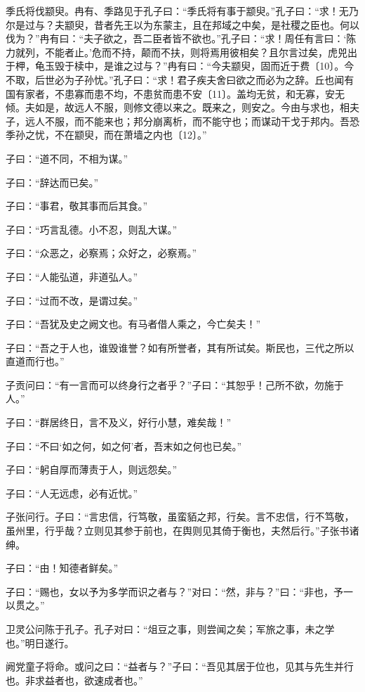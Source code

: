 \documentclass[a5paper]{ctexbook}
\begin{document}
    季氏将伐颛臾。冉有、季路见于孔子曰：“季氏将有事于颛臾。”孔子曰：“求！无乃尔是过与？夫颛臾，昔者先王以为东蒙主，且在邦域之中矣，是社稷之臣也。何以伐为？”冉有曰：“夫子欲之，吾二臣者皆不欲也。”孔子曰：“求！周任有言曰：‘陈力就列，不能者止。’危而不持，颠而不扶，则将焉用彼相矣？且尔言过矣，虎兕出于柙，龟玉毁于椟中，是谁之过与？”冉有曰：“今夫颛臾，固而近于费〔10〕。今不取，后世必为子孙忧。”孔子曰：“求！君子疾夫舍曰欲之而必为之辞。丘也闻有国有家者，不患寡而患不均，不患贫而患不安〔11〕。盖均无贫，和无寡，安无倾。夫如是，故远人不服，则修文德以来之。既来之，则安之。今由与求也，相夫子，远人不服，而不能来也；邦分崩离析，而不能守也；而谋动干戈于邦内。吾恐季孙之忧，不在颛臾，而在萧墙之内也〔12〕。”

    子曰：“道不同，不相为谋。”
    
    子曰：“辞达而已矣。”

    子曰：“事君，敬其事而后其食。”

    子曰：“巧言乱德。小不忍，则乱大谋。”
    
    子曰：“众恶之，必察焉；众好之，必察焉。”
    
    子曰：“人能弘道，非道弘人。”
    
    子曰：“过而不改，是谓过矣。”

    子曰：“吾犹及史之阙文也。有马者借人乘之，今亡矣夫！”

    子曰：“吾之于人也，谁毁谁誉？如有所誉者，其有所试矣。斯民也，三代之所以直道而行也。”

    子贡问曰：“有一言而可以终身行之者乎？”子曰：“其恕乎！己所不欲，勿施于人。”

    子曰：“群居终日，言不及义，好行小慧，难矣哉！”

    子曰：“不曰‘如之何，如之何’者，吾末如之何也已矣。”

    子曰：“躬自厚而薄责于人，则远怨矣。”

    子曰：“人无远虑，必有近忧。”

    子张问行。子曰：“言忠信，行笃敬，虽蛮貊之邦，行矣。言不忠信，行不笃敬，虽州里，行乎哉？立则见其参于前也，在舆则见其倚于衡也，夫然后行。”子张书诸绅。

    子曰：“由！知德者鲜矣。”

    子曰：“赐也，女以予为多学而识之者与？”对曰：“然，非与？”曰：“非也，予一以贯之。”

    卫灵公问陈于孔子。孔子对曰：“俎豆之事，则尝闻之矣；军旅之事，未之学也。”明日遂行。

    阙党童子将命。或问之曰：“益者与？”子曰：“吾见其居于位也，见其与先生并行也。非求益者也，欲速成者也。”
\end{document}
